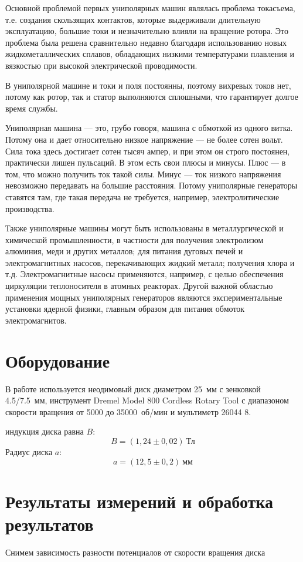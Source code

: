 Основной проблемой первых униполярных
машин являлась проблема токасъема, т.е.
создания скользящих контактов, которые
выдерживали длительную эксплуатацию,
большие токи и
незначительно влияли на вращение ротора. 
Это проблема была решена сравнительно
недавно благодаря использованию новых
жидкометаллических сплавов, обладающих
низкими температурами плавления и
вязкостью при высокой электрической
проводимости.  

В униполярной машине и токи и поля
постоянны, поэтому вихревых токов нет,
потому как ротор, так и статор
выполняются сплошными, что гарантирует
долгое время службы.
 
Униполярная машина — это, грубо
говоря, машина с обмоткой из одного
витка. Потому она и дает относительно
низкое напряжение — не более сотен
вольт. Сила тока здесь достигает сотен
тысяч ампер, и при этом он строго
постоянен, практически лишен пульсаций.
В этом есть свои плюсы и минусы. Плюс —
в том, что можно получить ток такой
силы. Минус — ток низкого напряжения
невозможно передавать на большие
расстояния. Потому униполярные
генераторы ставятся там, где такая
передача не требуется, например,
электролитические производства.

Также униполярные машины могут быть
использованы в металлургической и
химической промышленности, в частности
для получения электролизом алюминия,
меди и других металлов; для питания
дуговых печей и электромагнитных
насосов, перекачивающих жидкий металл;
получения хлора и т.д. Электромагнитные
насосы применяются, например, с целью
обеспечения циркуляции теплоносителя в
атомных реакторах. Другой важной
областью применения мощных униполярных
генераторов являются экспериментальные
установки ядерной физики, главным
образом для питания обмоток
электромагнитов.

\section{Оборудование}
В работе используется неодимовый диск
диаметром 25~мм с зенковкой 4.5/7.5~мм,
инструмент Dremel Model 800 Cordless
Rotary Tool с диапазоном скорости
вращения от 5000 до
35000~об/мин и мультиметр 26044 8.

 индукция диска равна $B$:
\[
    B = (1,24\pm 0,02) \ \text{Тл}
\]
Радиус диска $a$:
\[
    a = (12,5\pm 0,2) \ \text{мм}
\]


\section{Результаты измерений и обработка результатов}
Снимем зависимость разности потенциалов
от скорости вращения диска 
\renewcommand{\arraystretch}{1.15}

